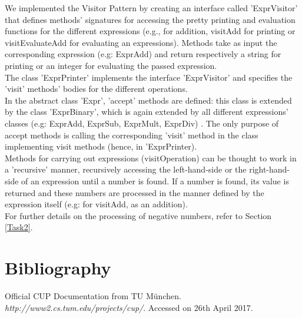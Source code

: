 \documentclass[paper=a4, fontsize=11pt]{scrartcl}
\numberwithin{equation}{section}		%
\numberwithin{figure}{section}			%
\numberwithin{table}{section}				%
\begin{document}
We implemented the Visitor Pattern by creating an interface called 'ExprVisitor' that defines methods' signatures for accessing the pretty printing and evaluation functions for the different expressions (e.g., for addition, visitAdd for printing or visitEvaluateAdd for evaluating an expressions). Methods take as input the corresponding expression (e.g: ExprAdd) and return respectively a string for printing or an integer for evaluating the passed expression.  \\
The class 'ExprPrinter' implements the interface 'ExprVisitor' and specifies the 'visit' methods' bodies for the different operations. \\
In the abstract class 'Expr', 'accept' methods are defined: this class is extended by the class 'ExprBinary', which is again extended by all different expressions' classes (e.g: ExprAdd, ExprSub, ExprMult, ExprDiv) . The only purpose of accept methods is calling the corresponding 'visit' method in the class implementing visit methods (hence, in 'ExprPrinter). \\
Methods for carrying out expressions (visitOperation) can be thought to work in a 'recursive' manner, recursively accessing the left-hand-side or the right-hand-side of an expression until a number is found. If a number is found, its value is returned and these numbers are processed in the manner defined by the expression itself (e.g: for visitAdd, as an addition). \\
For further details on the processing of negative numbers, refer to Section \ref{Task2}.


 
\section{Bibliography}
\begin{thebibliography}{9}%
Official CUP Documentation from TU M\"unchen. \textit{http://www2.cs.tum.edu/projects/cup/}. Accessed on 26th April 2017.
\end{thebibliography}
\end{document}
